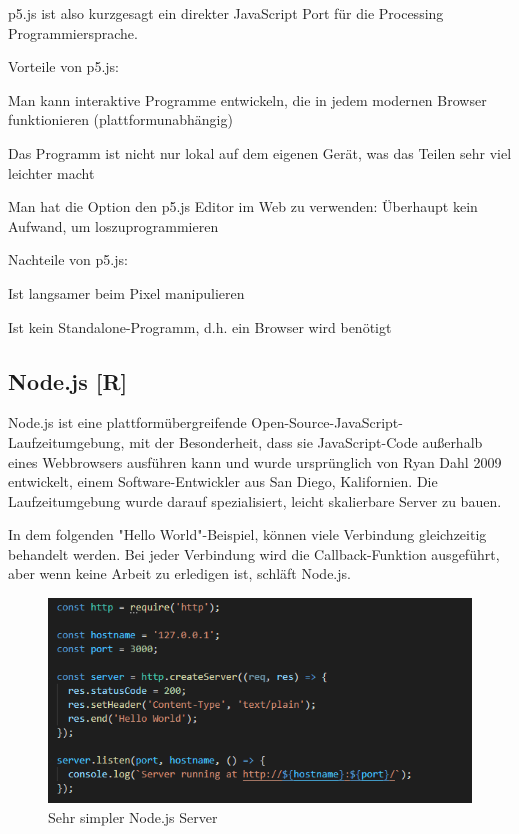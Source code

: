 p5.js ist also kurzgesagt ein direkter JavaScript Port für die Processing Programmiersprache.

Vorteile von p5.js:
\begin{compactitem}
    \item Man kann interaktive Programme entwickeln, die in jedem modernen Browser funktionieren (plattformunabhängig)
    \item Das Programm ist nicht nur lokal auf dem eigenen Gerät, was das Teilen sehr viel leichter macht
    \item Man hat die Option den p5.js Editor im Web zu verwenden: Überhaupt kein Aufwand, um loszuprogrammieren
\end{compactitem}

Nachteile von p5.js:
\begin{compactitem}
    \item Ist langsamer beim Pixel manipulieren
    \item Ist kein Standalone-Programm, d.h. ein Browser wird benötigt
\end{compactitem}

\subsection {Node.js [R]}
Node.js ist eine plattformübergreifende Open-Source-JavaScript-Laufzeitumgebung, mit der Besonderheit, dass sie JavaScript-Code außerhalb eines Webbrowsers ausführen kann
und wurde ursprünglich von Ryan Dahl 2009 entwickelt, einem Software-Entwickler aus San Diego, Kalifornien.
Die Laufzeitumgebung wurde darauf spezialisiert, leicht skalierbare Server zu bauen.

In dem folgenden "Hello World"-Beispiel, können viele Verbindung gleichzeitig behandelt werden. Bei jeder Verbindung wird die Callback-Funktion ausgeführt, aber wenn keine Arbeit zu erledigen ist, schläft Node.js.

\begin{figure}[H]
    \centering
    \includegraphics[scale=1]{pics/node js.PNG}
    \caption{Sehr simpler Node.js Server}
\end{figure}

